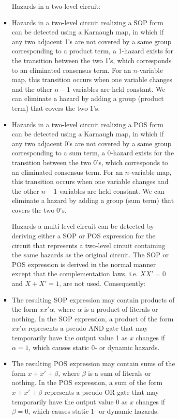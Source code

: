 \documentclass[a4paper,12pt]{article}
\begin{document}
\begin{itemize}
\begin{itemize}
\begin{itemize}
\begin{itemize}
\begin{itemize}
\begin{itemize}
\begin{itemize}
Hazards in a two-level circuit:
\bit
\item Hazards in a two-level circuit realizing a SOP form can be detected using a Karnaugh map, in which if any two adjacent 1's are not covered by a same group corresponding to a product term, a 1-hazard exists for the transition between the two 1's, which corresponds to an eliminated consensus term. For an $n$-variable map, this transition occurs when one variable changes and the other $n-1$ variables are held constant. We can eliminate a hazard by adding a group (product term) that covers the two 1's.
\item Hazards in a two-level circuit realizing a POS form can be detected using a Karnaugh map, in which if any two adjacent 0's are not covered by a same group corresponding to a sum term, a 0-hazard exists for the transition between the two 0's, which corresponds to an eliminated consensus term. For an $n$-variable map, this transition occurs when one variable changes and the other $n-1$ variables are held constant. We can eliminate a hazard by adding a group (sum term) that covers the two 0's.
\eit

Hazards a multi-level circuit can be detected by deriving either a SOP or POS expression for the circuit that represents a two-level circuit containing the same hazards as the original circuit. The SOP or POS expression is derived in the normal manner except that the complementation laws, i.e. $XX'=0$ and $X+X'=1$, are not used. Consequently:
\bit
\item The resulting SOP expression may contain products of the form $xx'\alpha$, where $\alpha$ is a product of literals or nothing. In the SOP expression, a product of the form $xx'\alpha$ represents a pseudo AND gate that may temporarily have the output value 1 as $x$ changes if $\alpha=1$, which causes static 0- or dynamic hazards.
\item The resulting POS expression may contain sums of the form $x+x'+\beta$, where $\beta$ is a sum of literals or nothing. In the POS expression, a sum of the form $x+x'+\beta$ represents a pseudo OR gate that may temporarily have the output value 0 as $x$ changes if $\beta=0$, which causes static 1- or dynamic hazards.
\eit


\end{itemize}
\end{itemize}
\end{itemize}
\end{itemize}
\end{itemize}
\end{itemize}
\end{itemize}
\end{document}
